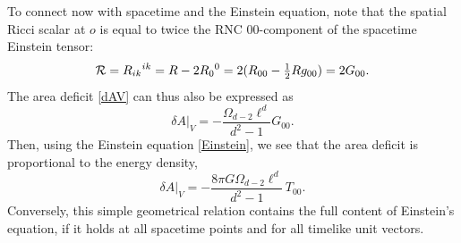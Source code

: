 \documentclass[aps,prd,twocolumn,showpacs,groupedaddress,nofootinbib,longbibliography]{revtex4-1}
\def\beq{\begin{equation}}
\def\eeq{\end{equation}}
\def\d{\delta}\def\D{\Delta}
\def\O{\Omega}
\def\half{{\textstyle{\frac{1}{2}}}}
\begin{document}
To connect now with spacetime and the Einstein equation, note that the spatial Ricci scalar 
at $o$ is equal to twice the RNC $00$-component of the spacetime Einstein tensor: 
%
\beq\label{RG00}
{\cal R}=R_{ik}{}^{ik}=R-2R_0{}^0=2(R_{00}-\half R g_{00})=2G_{00}.
\eeq
%
The area deficit \eqref{dAV} can thus also be expressed as 
%
\beq\label{dAVG}
\d A|_V = -\frac{\O_{d-2}\ell^d}{d^2-1} G_{00}.
\eeq
%
Then, using the Einstein equation \eqref{Einstein}, 
we see that the area deficit is proportional to the energy density,
%
\beq\label{dAT}
\d A|_V = - \frac{8\pi G\O_{d-2}\ell^d}{d^2-1} \,T_{00}.
\eeq
%
Conversely, this
simple geometrical relation contains the full content of Einstein's equation,
if it holds at all spacetime points and for all timelike unit vectors. 
\end{document}
